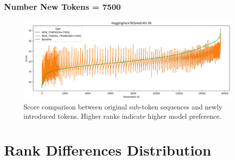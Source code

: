 \subsubsection*{Number New Tokens = 7500}
\begin{figure}[H]
    \centering
    \includegraphics[width=\textwidth]{Figures/Appendix/token-rank-comparison_7500_smol3B.png}
    \caption{Score comparison between original sub-token sequences and newly introduced tokens. Higher ranks indicate higher model preference.}
    \label{fig:new_token_rank:7500_smol3B}
\end{figure}
\FloatBarrier





% 
%
%
%
\section*{Rank Differences Distribution}


